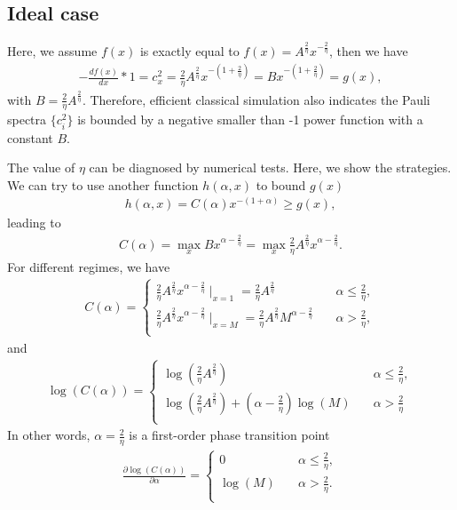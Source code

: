\documentclass[showpacs,amsmath,amssymb,twocolumn,superscriptaddress,notitlepage,preprintnumbers,aps,pra,10pt,floatfix]{revtex4-2}
\begin{document}
\begin{appendix}
\subsection{Ideal case}
Here, we assume $f(x)$ is exactly equal to $f(x)=A^{\frac{2}{\eta}}x^{-\frac{2}{\eta}}$, then we have
\begin{eqnarray}
-\frac{df(x)}{dx}*1=c_x^2=\frac{2}{\eta}A^{\frac{2}{\eta}}x^{-(1+\frac{2}{\eta})}=Bx^{-(1+\frac{2}{\eta})}=g(x),
\end{eqnarray}
with $B=\frac{2}{\eta}A^{\frac{2}{\eta}}$. Therefore, efficient classical simulation also indicates the Pauli spectra $\{c_i^2\}$ is bounded by a negative smaller than -1 power function with a constant $B$.

The value of $\eta$ can be diagnosed by numerical tests. Here, we show the strategies. We can try to use another function $h(\alpha,x)$ to bound $g(x)$
\begin{eqnarray}
h(\alpha, x)=C(\alpha)x^{-(1+\alpha)}\geq g(x),
\end{eqnarray}
leading to
\begin{eqnarray}
C(\alpha)=\max_x B x^{\alpha-\frac{2}{\eta}}=\max_x\frac{2}{\eta}A^{\frac{2}{\eta}}x^{\alpha-\frac{2}{\eta}}.
\end{eqnarray}
For different regimes, we have
\begin{eqnarray}\label{pt1}
C(\alpha)= \begin{cases}
\frac{2}{\eta}A^{\frac{2}{\eta}}x^{\alpha-\frac{2}{\eta}}\mid_{x=1}=\frac{2}{\eta}A^{\frac{2}{\eta}} & \quad \alpha\leq \frac{2}{\eta}, \\
\frac{2}{\eta}A^{\frac{2}{\eta}}x^{\alpha-\frac{2}{\eta}}\mid_{x=M}=\frac{2}{\eta}A^{\frac{2}{\eta}}M^{\alpha-\frac{2}{\eta}}& \quad \alpha>\frac{2}{\eta},\\
\end{cases}
\end{eqnarray}
and 
\begin{eqnarray}
\log(C(\alpha))= \begin{cases}
\log(\frac{2}{\eta}A^{\frac{2}{\eta}}) & \quad \alpha\leq \frac{2}{\eta}, \\
\log(\frac{2}{\eta}A^{\frac{2}{\eta}})+(\alpha-\frac{2}{\eta})\log(M)& \quad \alpha>\frac{2}{\eta}\\
\end{cases}
\end{eqnarray}
In other words, $\alpha=\frac{2}{\eta}$ is a first-order phase transition point
\begin{eqnarray}
\frac{\partial\log(C(\alpha))}{\partial \alpha}= \begin{cases}
0 & \quad \alpha\leq \frac{2}{\eta}, \\
\log(M)& \quad \alpha>\frac{2}{\eta}.\\
\end{cases}
\end{eqnarray}


\end{appendix}
\end{document}

